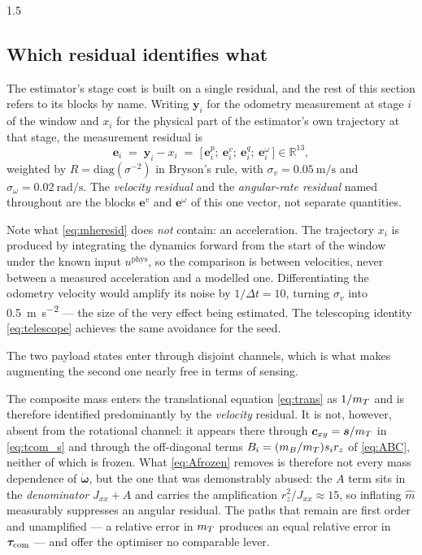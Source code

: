 \begin{spacing}{1.5}
\subsection{Which residual identifies what}\label{sec:model:observability}

The estimator's stage cost is built on a single residual, and the rest of this
section refers to its blocks by name. Writing $\bm y_i$ for the odometry
measurement at stage $i$ of the window and $x_i$ for the physical part of the
estimator's own trajectory at that stage, the measurement residual is
\begin{equation}
\bm e_i \;=\; \bm y_i - x_i
\;=\; \bigl[\,\bm e^p_i;\ \bm e^v_i;\ \bm e^q_i;\ \bm e^{\omega}_i\,\bigr]
\in \mathbb{R}^{13},
\label{eq:mheresid}
\end{equation}
weighted by $R=\mathrm{diag}(\sigma^{-2})$ in Bryson's rule, with
$\sigma_v=\SI{0.05}{\meter\per\second}$ and
$\sigma_{\omega}=\SI{0.02}{\radian\per\second}$. The \emph{velocity residual} and
the \emph{angular-rate residual} named throughout are the blocks $\bm e^v$ and
$\bm e^{\omega}$ of this one vector, not separate quantities.

Note what \eqref{eq:mheresid} does \emph{not} contain: an acceleration. The
trajectory $x_i$ is produced by integrating the dynamics forward from the start
of the window under the known input $u^{\mathrm{phys}}$, so the comparison is
between velocities, never between a measured acceleration and a modelled one.
Differentiating the odometry velocity would amplify its noise by
$1/\Delta t = 10$, turning $\sigma_v$ into \SI{0.5}{\meter\per\second\squared}
--- the size of the very effect being estimated. The telescoping identity
\eqref{eq:telescope} achieves the same avoidance for the seed.

The two payload states enter through disjoint channels, which is what makes
augmenting the second one nearly free in terms of sensing.

The composite mass enters the translational equation \eqref{eq:trans} as $1/m_T$
and is therefore identified predominantly by the \emph{velocity} residual. It is
not, however, absent from the rotational channel: it appears there through
$\bm{c}_{xy}=\bm{s}/m_T$ in \eqref{eq:tcom_s} and through the off-diagonal terms
$B_i=(m_B/m_T)s_i r_z$ of \eqref{eq:ABC}, neither of which is frozen. What
\eqref{eq:Afrozen} removes is therefore not every mass dependence of
$\dot{\bm{\omega}}$, but the one that was demonstrably abused: the $A$ term sits
in the \emph{denominator} $J_{xx}+A$ and carries the amplification
$r_z^2/J_{xx}\approx15$, so inflating $\hat m$ measurably suppresses an angular
residual. The paths that remain are first order and unamplified --- a relative
error in $m_T$ produces an equal relative error in $\bm{\tau}_{\mathrm{com}}$ --- and offer the
optimiser no comparable lever.


\end{spacing}
